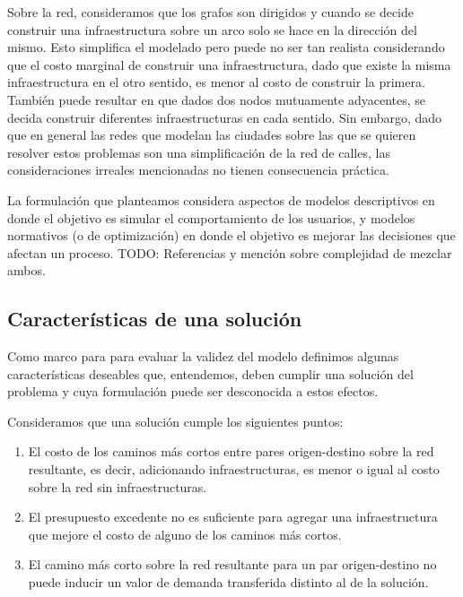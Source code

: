 \documentclass{article}
\begin{document}
  Sobre la red, consideramos que los grafos son dirigidos y cuando se decide construir una infraestructura sobre un arco solo se hace en la dirección del mismo. Esto simplifica el modelado pero puede no ser tan realista considerando que el costo marginal de construir una infraestructura, dado que existe la misma infraestructura en el otro sentido, es menor al costo de construir la primera. También puede resultar en que dados dos nodos mutuamente adyacentes, se decida construir diferentes infraestructuras en cada sentido. Sin embargo, dado que en general las redes que modelan las ciudades sobre las que se quieren resolver estos problemas son una simplificación de la red de calles, las consideraciones irreales mencionadas no tienen consecuencia práctica.

  La formulación que planteamos considera aspectos de modelos descriptivos en donde el objetivo es simular el comportamiento de los usuarios, y modelos normativos (o de optimización) en donde el objetivo es mejorar las decisiones que afectan un proceso. TODO: Referencias y mención sobre complejidad de mezclar ambos.

  \subsection{Características de una solución}
  \label{sect:solutioncharacteristics}

  Como marco para para evaluar la validez del modelo definimos algunas características deseables que, entendemos, deben cumplir una solución del problema y cuya formulación puede ser desconocida a estos efectos.

  Consideramos que una solución cumple los siguientes puntos:

  \begin{enumerate}
      \item{El costo de los caminos más cortos entre pares origen-destino sobre la red resultante, es decir, adicionando infraestructuras, es menor o igual al costo sobre la red sin infraestructuras.}
    \item{\label{budgetexcess} El presupuesto excedente no es suficiente para agregar una infraestructura que mejore el costo de alguno de los caminos más cortos.}
    \item{El camino más corto sobre la red resultante para un par origen-destino no puede inducir un valor de demanda transferida distinto al de la solución.}
  \end{enumerate}
\end{document}
